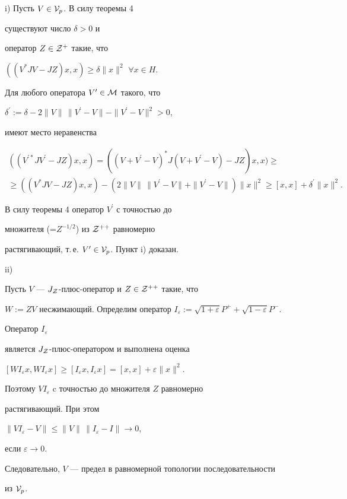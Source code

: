 \begin{pf}


i) Пусть $V\in {\cal V}_{p}$. В силу теоремы 4


существуют число $\delta >0$ и


оператор $Z\in {\cal Z}^{+}$ такие, что


$((V^{*}JV-JZ)x,x)\geq\delta\| x\|^{2}$ $\forall x\in H$.


Для любого оператора $V^{\prime}\in \cal M$ такого, что


$\delta^{\prime}


:=\delta -2\| V\|\,\| V^{\prime}-V\| -\|V^{\prime}-V\|^{2}>0$,


имеют место неравенства


\begin{gather*}


((V^{\prime *}JV^{\prime}-JZ)x,x)=


((V+V^{\prime}-V)^{*}J(V+V^{\prime}-V)-JZ)x,x)\geq \\


%


\geq ((V^{*}JV-JZ)x,x)-(2\| V\|\,\|


V^{\prime}-V\| +\| V^{\prime}-V\|)\| x\|^{2}\geq


[x,x]+\delta^{\prime}\| x\|^{2}.


\end{gather*}


В силу теоремы 4 оператор $V^{\prime}$ с точностью до


множителя (=$Z^{-1/2}$) из ${\cal Z}^{++}$ равномерно


растягивающий, т.\,е. $V^{\prime}\in {\cal V}_{p}$. Пункт i) доказан.





ii)


Пусть $V$ --- $J_{\cal Z}$-плюс-оператор и $Z\in {\cal Z}^{++}$ такие, что


$W:=ZV$ несжимающий. Определим оператор $I_{\varepsilon}:=


\sqrt{1+\varepsilon}P^{+}+\sqrt{1-\varepsilon}P^{-}$.


Оператор $I_{\varepsilon}$


является $J_{\cal Z}$-плюс-оператором и выполнена оценка


$[WI_{\varepsilon}x,WI_{\varepsilon}x]\geq


[I_{\varepsilon}x,I_{\varepsilon}x]=


[x,x]+\varepsilon\| x\|^{2}$.


Поэтому $VI_{\varepsilon}$ c точностью до множителя $Z$ равномерно


растягивающий. При этом


$\| VI_{\varepsilon}-V\|\leq\| V\|\,\| I_{\varepsilon}-I\| \to 0$,


если $\varepsilon\to 0$.


Следовательно, $V$ --- предел в равномерной топологии последовательности


из ${\cal V}_{p}$.


\end{pf}





